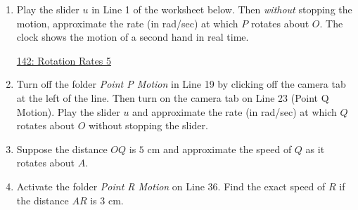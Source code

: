\documentclass{ximera}
\begin{document}
\begin{question}  \label{Q3245rghh5ty5t}
\begin{enumerate}

\item Play the slider $u$ in Line 1 of the worksheet below. Then \emph{without} stopping the motion, approximate the rate (in rad/sec) at which $P$ rotates about $O$. The clock shows the motion of a second hand in real time.

\begin{onlineOnly}
\begin{center}
\end{center}
\end{onlineOnly}

\href{https://www.desmos.com/calculator/9on2xpcvta}{142: Rotation Rates 5}

\item Turn off the folder \emph{Point P Motion} in Line 19 by clicking off the camera tab at the left of the line. Then turn on the camera tab on Line 23 (Point Q Motion). Play the slider $u$ and approximate the rate (in rad/sec) at which $Q$ rotates about $O$ without stopping the slider.

\item Suppose the distance $OQ$ is $5$ cm and approximate the speed of $Q$ as it rotates about $A$.

\item Activate the folder \emph{Point R Motion} on Line 36. Find the exact speed of $R$ if the distance $AR$ is $3$ cm. 

\end{enumerate}

\end{question}
\end{document}
